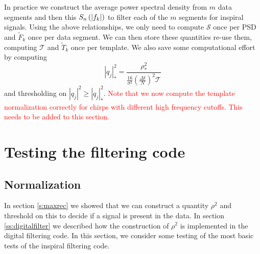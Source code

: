 In practice we construct the average power spectral density from $m$ data
segments and then this $S_n\left(\left|f_{k}\right|\right)$ to filter each of the $m$ segments for
inspiral signals. Using the above relationships, we only need to compute
$\mathcal{S}$ once per PSD and $\tilde{F}_k$ once per data segment. We can
then store these quantities re-use them, computing $\mathcal{T}$ and
$\tilde{T}_k$ once per template. We also save some computational effort by
computing
\begin{equation}
|q_j|^2_\ast = \frac{\rho^2_\ast} 
{\frac{16}{\sigma^2}\left(\frac{\Delta t}{N}\right)^2 \mathcal{T}}
\end{equation}
and thresholding on $|q_j|^2 \ge |q_j|^2_\ast$. \textcolor{red}{Note that we
now compute the template normalization correctly for chirps with different
high frequency cutoffs. This needs to be added to this section.}

\section{Testing the filtering code}
\label{s:testing}

\subsection{Normalization}
\label{ss:normalization}

In section \ref{s:maxrec} we showed that we can construct a quantity $\rho^2$
and threshold on this to decide if a signal is present in the data. In section
\ref{ss:digitalfilter} we described how the construction of $\rho^2$ is
implemented in the digital filtering code. In this section, we consider some 
testing of the most basic tests of the inspiral filtering code.

